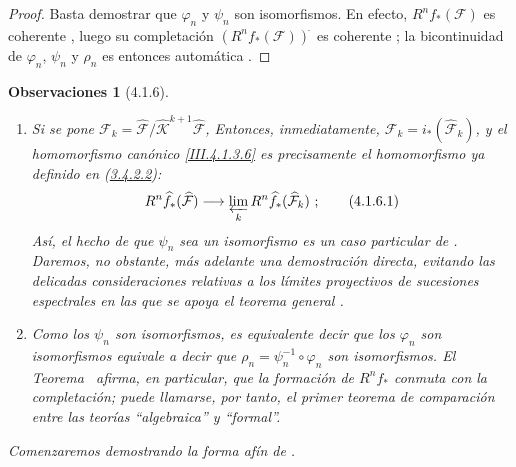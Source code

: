 \documentclass[10pt,oneside,openany]{book}
\theoremstyle{egaenv}\newtheorem*{env}{---}
\theoremstyle{egastatement}
\theoremstyle{egadescription}
\newtheorem*{remarks}{Observaciones}
\begin{document}
\begin{proof}
Basta demostrar que $\varphi_n$ y $\psi_n$ son isomorfismos.
En efecto, $R^nf_*(\mathcal F)$ es coherente , luego
su completación $(R^nf_*(\mathcal F))^{\widehat{\,}}$ es coherente
; la bicontinuidad de $\varphi_n$, $\psi_n$ y
$\rho_n$ es entonces automática .
\end{proof}

\begin{remarks}[4.1.6]
\label{III.4.1.6-fr}
\upshape
\begin{enumerate}
\item[(i)] Si se pone $\mathcal F_k=
\widehat{\mathcal F}/\widehat{\mathcal K}^{k+1}
\widehat{\mathcal F}$,
  Entonces, inmediatamente,
  $\mathcal F_k=i_*(\widehat{\mathcal F}_k)$,
  y el homomorfismo canónico \eqref{III.4.1.3.6} es precisamente el
  homomorfismo ya definido en (\hyperref[III.3.4.2.2]{3.4.2.2}):
  \[
R^n\widehat f_*(\widehat{\mathcal F})
\longrightarrow\varprojlim_kR^n\widehat f_*(\widehat{\mathcal F}_k)~;
\tag{4.1.6.1}\label{III.4.1.6.1-fr}
\]
  Así, el hecho de que $\psi_n$ sea un isomorfismo es un caso particular
  de .
  Daremos, no obstante, más adelante una demostración directa, evitando
  las delicadas consideraciones relativas a los límites proyectivos de
  sucesiones espectrales  en las que se apoya el teorema
  general .

  \item[(ii)] Como los $\psi_n$ son isomorfismos, es equivalente decir que los $\varphi_n$ son isomorfismos equivale a decir que
  $\rho_n=\psi_n^{-1}\circ\varphi_n$
  son isomorfismos.
  El Teorema~ afirma, en particular, que \emph{la formación de}
  $R^nf_*$ \emph{conmuta con la completación}; puede llamarse, por tanto, el
  \emph{primer teorema de comparación} entre las teorías ``algebraica'' y
  ``formal''.
\end{enumerate}
Comenzaremos demostrando la forma afín de .
\end{remarks}
\end{document}
